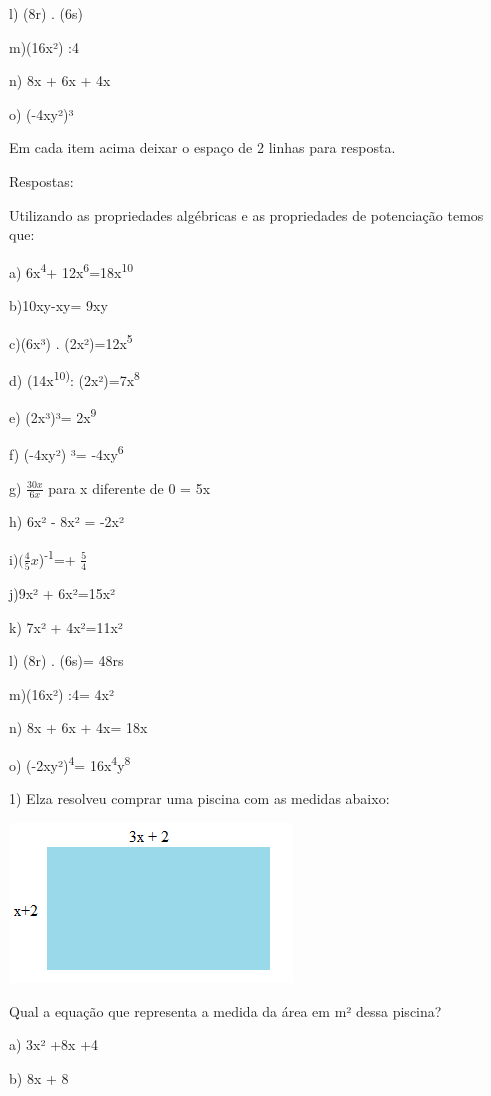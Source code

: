 {l) (8r) . (6s)

m)(16x²) :4

n) 8x + 6x + 4x

o) (-4xy²)³

Em cada item acima deixar o espaço de 2 linhas para resposta.

Respostas:

Utilizando as propriedades algébricas e as propriedades de potenciação
temos que:

a) 6x\textsuperscript{4}+ 12x\textsuperscript{6}=18x\textsuperscript{10}

b)10xy-xy= 9xy

c)(6x³) . (2x²)=12x\textsuperscript{5}

d) (14x\textsuperscript{10)}: (2x²)=7x\textsuperscript{8}

e) (2x³)³= 2x\textsuperscript{9}

f) (-4xy²) ³= -4xy\textsuperscript{6}

g) \(\frac{30x}{6x}\) para x diferente de 0 = 5x

h) 6x² - 8x² = -2x²

i)\((\frac{4}{5}x\))\textsuperscript{-1}=+ \(\frac{5}{4}\)

j)9x² + 6x²=15x²

k) 7x² + 4x²=11x²

l) (8r) . (6s)= 48rs

m)(16x²) :4= 4x²

n) 8x + 6x + 4x= 18x

o) (-2xy²)\textsuperscript{4}=
16x\textsuperscript{4}y\textsuperscript{8}


1) Elza resolveu comprar uma piscina com as medidas abaixo:

\includegraphics[width=2.9625in,height=1.67014in]{./imgSAEB_8_MAT/media/image6.png}

Qual a equação que representa a medida da área em m² dessa piscina?

a) 3x² +8x +4

b) 8x + 8

}
